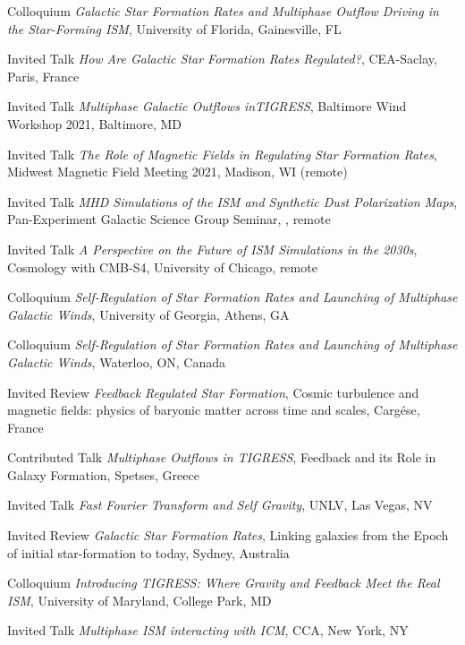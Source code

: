 \documentclass[12pt]{article}
\begin{document}
{Colloquium}
{\emph{Galactic Star Formation Rates and Multiphase Outflow Driving in the Star-Forming ISM},
University of Florida,
Gainesville, FL}

{Invited Talk}
{\emph{How Are Galactic Star Formation Rates Regulated?},
CEA-Saclay,
Paris, France}

{Invited Talk}
{\emph{Multiphase Galactic Outflows inTIGRESS},
Baltimore Wind Workshop 2021,
Baltimore, MD}

{Invited Talk}
{\emph{The Role of Magnetic Fields in Regulating Star Formation Rates},
Midwest Magnetic Field Meeting 2021,
Madison, WI (remote)}

{Invited Talk}
{\emph{MHD Simulations of the ISM and Synthetic Dust Polarization Maps},
Pan-Experiment Galactic Science Group Seminar,
\href{https://galsci.github.io}, remote}

{Invited Talk}
{\emph{A Perspective on the Future of ISM Simulations in the 2030s},
Cosmology with CMB-S4,
University of Chicago, remote}

{Colloquium}
{\emph{Self-Regulation of Star Formation Rates and Launching of Multiphase Galactic Winds},
University of Georgia,
Athens, GA}

{Colloquium}
{\emph{Self-Regulation of Star Formation Rates and Launching of Multiphase Galactic Winds},
Waterloo,
ON, Canada}

{Invited Review}
{\emph{Feedback Regulated Star Formation},
Cosmic turbulence and magnetic fields: physics of baryonic matter across time and scales,
Carg\'ese, France}

{Contributed Talk}
{\emph{Multiphase Outflows in TIGRESS},
Feedback and its Role in Galaxy Formation,
Spetses, Greece}

{Invited Talk}
{\emph{Fast Fourier Transform and Self Gravity},
UNLV,
Las Vegas, NV}

{Invited Review}
{\emph{Galactic Star Formation Rates},
Linking galaxies from the Epoch of initial star-formation to today,
Sydney, Australia}

{Colloquium}
{\emph{Introducing TIGRESS: Where Gravity and Feedback Meet the Real ISM},
University of Maryland,
College Park, MD}

{Invited Talk}
{\emph{Multiphase ISM interacting with ICM},
CCA,
New York, NY}
\end{document}

